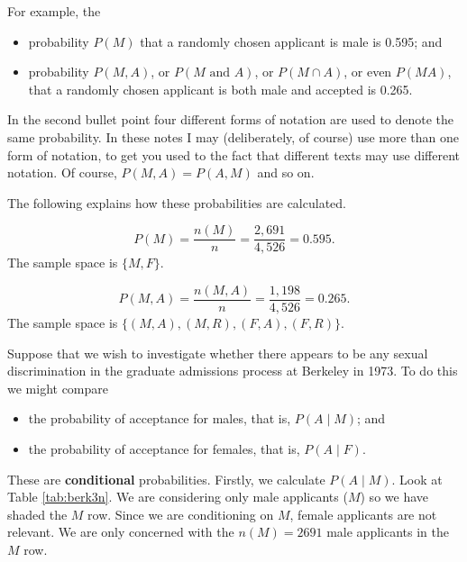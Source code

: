 \documentclass[
  british,
]{book}
\providecommand{\tightlist}{%
  \setlength{\itemsep}{0pt}\setlength{\parskip}{0pt}}
\begin{document}
\FloatBarrier

For example, the

\begin{itemize}
\tightlist
\item
  probability \(P(M)\) that a randomly chosen applicant is male is 0.595; and
\item
  probability \(P(M, A)\), or \(P(M \mbox{ and } A)\), or \(P(M \cap A)\), or even \(P(MA)\), that a randomly chosen applicant is both male and accepted is 0.265.
\end{itemize}

In the second bullet point four different forms of notation are used to denote the same probability. In these notes I may (deliberately, of course) use more than one form of notation, to get you used to the fact that different texts may use different notation. Of course, \(P(M, A) = P(A, M)\) and so on.

The following explains how these probabilities are calculated.

\[P(M) = \frac{n(M)}{n} = \frac{2,691}{4,526} = 0.595.\]
The sample space is \(\{M,F\}\).

\[P(M , A) = \frac{n(M , A)}{n} = \frac{1,198}{4,526} = 0.265.\]
The sample space is \(\{(M , A),(M , R),(F , A),(F , R)\}\).

Suppose that we wish to investigate whether there appears to be any sexual discrimination in the graduate admissions process at Berkeley in 1973. To do this we might compare

\begin{itemize}
\tightlist
\item
  the probability of acceptance for males, that is, \(P(A \mid M)\); and
\item
  the probability of acceptance for females, that is, \(P(A \mid F)\).
\end{itemize}

These are \textbf{conditional} probabilities. Firstly, we calculate \(P(A \mid M)\). Look at Table \ref{tab:berk3n}. We are considering only male applicants (\(M\)) so we have shaded the \(M\) row. Since we are conditioning on \(M\), female applicants are not relevant. We are only concerned with the \(n(M)=2691\) male applicants in the \(M\) row.

 
  \providecommand{\huxb}[2]{\arrayrulecolor[RGB]{#1}\global\arrayrulewidth=#2pt}
  \providecommand{\huxvb}[2]{\color[RGB]{#1}\vrule width #2pt}
  \providecommand{\huxtpad}[1]{\rule{0pt}{#1}}
  \providecommand{\huxbpad}[1]{\rule[-#1]{0pt}{#1}}
\end{document}

